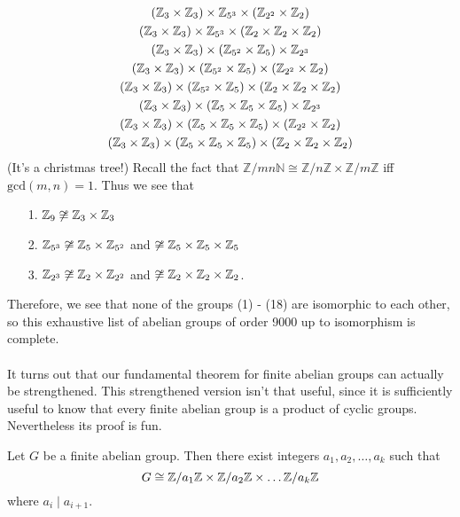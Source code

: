     \begin{gather}
        (\mathbb{Z}_3 \times \mathbb{Z}_3) \times \mathbb{Z}_{5^3} \times (\mathbb{Z}_{2^2} \times \mathbb{Z}_2)\\
        (\mathbb{Z}_3 \times \mathbb{Z}_3) \times \mathbb{Z}_{5^3} \times (\mathbb{Z}_{2} \times \mathbb{Z}_2 \times \mathbb{Z}_2)\\
        (\mathbb{Z}_3 \times \mathbb{Z}_3) \times (\mathbb{Z}_{5^2} \times \mathbb{Z}_5) \times \mathbb{Z}_{2^3} \\
        (\mathbb{Z}_3 \times \mathbb{Z}_3) \times (\mathbb{Z}_{5^2} \times \mathbb{Z}_5) \times (\mathbb{Z}_{2^2} \times \mathbb{Z}_2)\\
        (\mathbb{Z}_3 \times \mathbb{Z}_3) \times (\mathbb{Z}_{5^2} \times \mathbb{Z}_5) \times (\mathbb{Z}_{2} \times \mathbb{Z}_2 \times \mathbb{Z}_2)\\
        (\mathbb{Z}_3 \times \mathbb{Z}_3) \times (\mathbb{Z}_{5} \times \mathbb{Z}_5 \times \mathbb{Z}_5) \times \mathbb{Z}_{2^3} \\
        (\mathbb{Z}_3 \times \mathbb{Z}_3) \times (\mathbb{Z}_{5} \times \mathbb{Z}_5 \times \mathbb{Z}_5) \times (\mathbb{Z}_{2^2} \times \mathbb{Z}_2)\\
       (\mathbb{Z}_3 \times \mathbb{Z}_3) \times (\mathbb{Z}_{5} \times \mathbb{Z}_5 \times \mathbb{Z}_5) \times (\mathbb{Z}_{2} \times \mathbb{Z}_2 \times \mathbb{Z}_2)
    \end{gather}
    (It's a christmas tree!) Recall the fact that
    $\mathbb{Z}/mn\mathbb{N} \cong \mathbb{Z}/n\mathbb{Z} \times
    \mathbb{Z}/m\mathbb{Z}$
    iff $\mbox{gcd}(m, n) = 1$. Thus we see that 
    \begin{itemize}
        \item[1.] $\mathbb{Z}_9 \not\cong \mathbb{Z}_3 \times \mathbb{Z}_3$

        \item[2.] $\mathbb{Z}_{5^3} \not\cong \mathbb{Z}_5 \times \mathbb{Z}_{5^2}$ and
        $\not\cong \mathbb{Z}_5 \times \mathbb{Z}_5 \times \mathbb{Z}_5$

        \item[3.] $\mathbb{Z}_{2^3} \not\cong \mathbb{Z}_2 \times \mathbb{Z}_{2^2}$ and
        $\not\cong \mathbb{Z}_2 \times \mathbb{Z}_2 \times \mathbb{Z}_2$.
    \end{itemize}
    Therefore, we see that none of the groups (1) - (18) are
    isomorphic to each other, so this exhaustive list of abelian
    groups of order 9000 up to isomorphism is complete.
    \\
    \\
    It turns out that our fundamental theorem for finite abelian
    groups can actually be strengthened. This strengthened version
    isn't that useful, since it is sufficiently useful to know that
    every finite abelian group is a product of cyclic groups.
    Nevertheless its proof is fun. 

    \begin{thm}
        Let $G$ be a finite abelian group. Then there exist integers
        $a_1, a_2, \dots, a_k$ such that 
        \[
            G \cong \mathbb{Z}/a_1\mathbb{Z} \times \mathbb{Z}/a_2\mathbb{Z} \times \dots \mathbb{Z}/a_k\mathbb{Z}
        \]
        where $a_i \mid a_{i+1}$.
    \end{thm}

